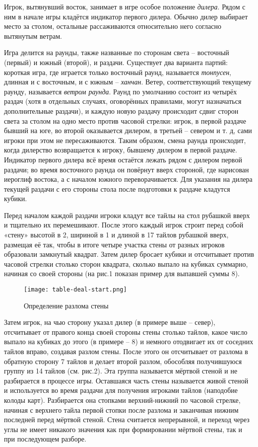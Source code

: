 Игрок, вытянувший восток, занимает в игре особое положение \textit{дилера}. Рядом с ним в начале игры кладётся индикатор первого дилера. Обычно дилер выбирает место за столом, остальные рассаживаются относительно него согласно вытянутым ветрам.

Игра делится на раунды, также названные по сторонам света – восточный (первый) и южный (второй), и раздачи. Существует два варианта партий: короткая игра, где играется только восточный раунд, называется \textit{тонпусен}, длинная и с восточным, и с южным – \textit{ханчан}. Ветер, соответствующий текущему раунду, называется \textit{ветром раунда}. Раунд по умолчанию состоит из четырёх раздач (хотя в отдельных случаях, оговорённых правилами, могут назначаться дополнительные раздачи), и каждую новую раздачу происходит сдвиг сторон света за столом на одно место против часовой стрелки: игрок, в первой раздаче бывший на юге, во второй оказывается дилером, в третьей – севером и т. д, сами игроки при этом не пересаживаются. Таким образом, смена раунда происходит, когда дилерство возвращается к игроку, бывшему дилером в первой раздаче. Индикатор первого дилера всё время остаётся лежать рядом с дилером первой раздачи; во время восточного раунда он повёрнут вверх стороной, где нарисован иероглиф востока, а с началом южного переворачивается. Для указания на дилера текущей раздачи с его стороны стола после подготовки к раздаче кладутся кубики.

Перед началом каждой раздачи игроки кладут все тайлы на стол рубашкой вверх и тщательно их перемешивают. После этого каждый игрок строит перед собой «стену» высотой в 2, шириной в 1 и длиной в 17 тайлов рубашкой вверх, размещая её так, чтобы в итоге четыре участка стены от разных игроков образовали замкнутый квадрат. Затем дилер бросает кубики и отсчитывает против часовой стрелки столько сторон квадрата, сколько выпало на кубиках суммарно, начиная со своей стороны (на рис.1 показан пример для выпавшей суммы 8).

\begin{figure}[H]
	\centering
	\texttt{[image: table-deal-start.png]}
	\caption{Определение разлома стены}
\end{figure}

Затем игрок, на чью сторону указал дилер (в примере выше – север), отсчитывает от правого конца своей стороны стены столько тайлов, какое число выпало на кубиках до этого (в примере – 8) и немного отодвигает их от соседних тайлов вправо, создавая разлом стены. После этого он отсчитывает от разлома в обратную сторону 7 тайлов и делает второй разлом, обособляя получившуюся группу из 14 тайлов (см. рис.2). Эта группа называется мёртвой стеной и не разбирается в процессе игры. Оставшаяся часть стены называется живой стеной и используется во время раздачи для получения игроками тайлов (наподобие колоды карт). Разбирается она стопками верхний-нижний по часовой стрелке, начиная с верхнего тайла первой стопки после разлома и заканчивая нижним последней перед мёртвой стеной. Стена считается непрерывной, и переход через углы не имеет никакого значения как при формировании мёртвой стены, так и при последующем разборе.

